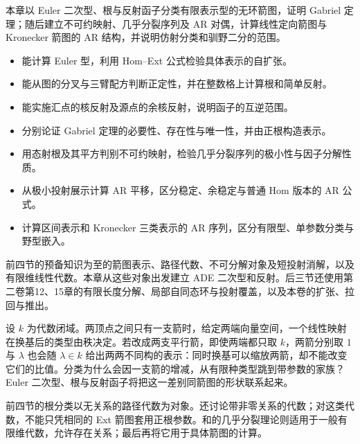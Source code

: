 
\begin{chapterabstract}
	本章以 Euler 二次型、根与反射函子分类有限表示型的无环箭图，证明 Gabriel 定理；随后建立不可约映射、几乎分裂序列及 AR 对偶，计算线性定向箭图与 Kronecker 箭图的 AR 结构，并说明仿射分类和驯野二分的范围。
\end{chapterabstract}

\begin{learninggoals}
	\begin{itemize}
		\item 能计算 Euler 型，利用 Hom--Ext 公式检验具体表示的自扩张。
		\item 能从图的分叉与三臂配方判断正定性，并在整数格上计算根和简单反射。
		\item 能实施汇点的核反射及源点的余核反射，说明函子的互逆范围。
		\item 分别论证 Gabriel 定理的必要性、存在性与唯一性，并由正根构造表示。
		\item 用态射根及其平方判别不可约映射，检验几乎分裂序列的极小性与因子分解性质。
		\item 从极小投射展示计算 AR 平移，区分稳定、余稳定与普通 Hom 版本的 AR 公式。
		\item 计算区间表示和 Kronecker 三类表示的 AR 序列，区分有限型、单参数分类与野型嵌入。
	\end{itemize}
	前四节的预备知识为至的箭图表示、路径代数、不可分解对象及短投射消解，以及有限维线性代数。本章从这些对象出发建立 ADE 二次型和反射。后三节还使用第二卷第12、15章的有限长度分解、局部自同态环与投射覆盖，以及本卷的扩张、拉回与推出。
\end{learninggoals}

设 \(k\) 为代数闭域。两顶点之间只有一支箭时，给定两端向量空间，一个线性映射在换基后的类型由秩决定。若改成两支平行箭，即使两端都只取 \(k\)，两箭分别取 \(1\) 与 \(\lambda\) 也会随 \(\lambda\in k\) 给出两两不同构的表示：同时换基可以缩放两箭，却不能改变它们的比值。分类为什么会因一支箭的增减，从有限种类型跳到带参数的家族？Euler 二次型、根与反射函子将把这一差别同箭图的形状联系起来。

\ProseParagraphBreak
前四节的根分类以无关系的路径代数为对象。还讨论带非零关系的代数；对这类代数，不能只凭相同的 Ext 箭图套用正根参数。和的几乎分裂理论则适用于一般有限维代数，允许存在关系；最后再将它用于具体箭图的计算。

